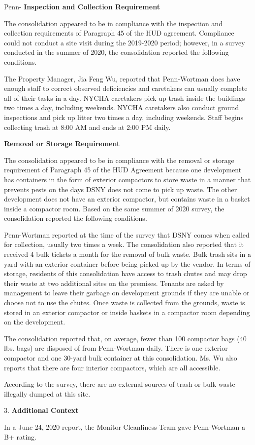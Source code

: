 Penn-
\textbf{Inspection and Collection Requirement}

The consolidation appeared to be in compliance with the inspection and collection requirements of Paragraph 45 of the HUD agreement. Compliance could not conduct a site visit during the 2019-2020 period; however, in a survey conducted in the summer of 2020, the consolidation reported the following conditions.

The Property Manager, Jia Feng Wu, reported that Penn-Wortman does have enough staff to correct observed deficiencies and caretakers can usually complete all of their tasks in a day. NYCHA caretakers pick up trash inside the buildings two times a day, including weekends. NYCHA caretakers also conduct ground inspections and pick up litter two times a day, including weekends. Staff begins collecting trash at 8:00 AM and ends at 2:00 PM daily. 

\textbf{Removal or Storage Requirement}

The consolidation appeared to be in compliance with the  removal or storage requirement of Paragraph  45 of the HUD Agreement because one development has containers in the form of exterior compactors to store waste in a manner that prevents pests on the days DSNY does not come to pick up waste. The other development does not have an exterior compactor, but contains waste in a basket inside a compactor room. Based on the same summer of  2020 survey, the consolidation reported the following conditions.

Penn-Wortman reported at the time of the survey that DSNY comes when called for collection, usually two times a week. The consolidation also reported that it received 4 bulk tickets a month for the removal of bulk waste. Bulk trash sits in a yard with an exterior container before being picked up by the vendor. In terms of storage, residents of this consolidation have access to trash chutes and may drop their waste at two additional sites on the premises. Tenants are asked by management to leave their garbage on development grounds if they are unable or choose not to use the chutes. Once waste is collected from the grounds, waste is stored in an exterior compactor or inside baskets in a compactor room depending on the development. 

The consolidation reported that, on average, fewer than 100 compactor bags (40 lbs. bags) are disposed of from Penn-Wortman daily. There is one exterior compactor and one 30-yard bulk container at this consolidation. Ms. Wu also reports that there are four interior compactors, which are all accessible.

According to the survey, there are no external sources of trash or bulk waste illegally dumped at this site. 

3. \textbf{Additional Context} 

In a June 24, 2020 report, the Monitor Cleanliness Team gave Penn-Wortman a B+ rating. 